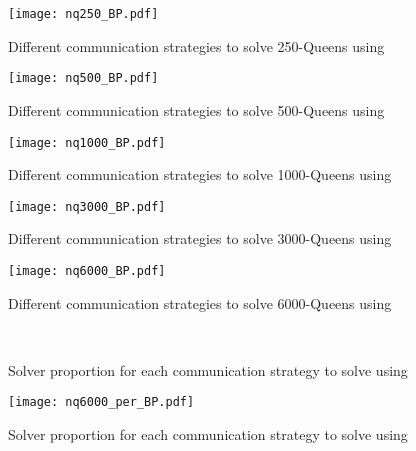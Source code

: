 \begin{figure}[!h]
\centering
\texttt{[image: nq250\_BP.pdf]}
\caption{Different communication strategies to solve 250-Queens using \posl}\label{boxplot:250}
\end{figure}

\begin{figure}[!h]
\centering
\texttt{[image: nq500\_BP.pdf]}
\caption{Different communication strategies to solve 500-Queens using \posl}\label{boxplot:500}
\end{figure}

\begin{figure}[!h]
\centering
\texttt{[image: nq1000\_BP.pdf]}
\caption{Different communication strategies to solve 1000-Queens using \posl}\label{boxplot:1000}
\end{figure}

\begin{figure}[!h]
\centering
\texttt{[image: nq3000\_BP.pdf]}
\caption{Different communication strategies to solve 3000-Queens using \posl}\label{boxplot:3000}
\end{figure}

\begin{figure}[!h]
\centering
\texttt{[image: nq6000\_BP.pdf]}
\caption{Different communication strategies to solve 6000-Queens using \posl}\label{boxplot:6000}
\end{figure}

\begin{figure}[!h]
\centering
{} %
\\
\caption[]{Solver proportion for each communication strategy to solve \NQP{} using \posl}
\label{fig:bars_nq}
\end{figure}

\begin{figure}[!h]
\centering
\texttt{[image: nq6000\_per\_BP.pdf]}
\caption{Solver proportion for each communication strategy to solve \NQP{} using \posl}\label{barplot:6000}
\end{figure}